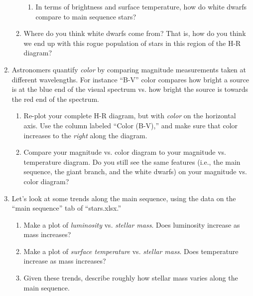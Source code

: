 \documentclass[11pt]{article}
\begin{document}
\begin{enumerate}
\begin{enumerate}
\begin{enumerate}
            \item In terms of brightness and surface temperature, how do white dwarfs compare to main sequence stars?
        \end{enumerate}
        
        \item Where do you think white dwarfs come from? That is, how do you think we end up with this rogue population of stars in this region of the H-R diagram?
    \end{enumerate}
    
    \item Astronomers quantify \emph{color} by comparing magnitude measurements taken at different wavelengths. For instance ``B-V'' color compares how bright a source is at the blue end of the visual spectrum vs. how bright the source is towards the red end of the spectrum.
    \begin{enumerate}
        \item Re-plot your complete H-R diagram, but with \emph{color} on the horizontal axis. Use the column labeled ``Color (B-V),'' and make sure that color increases to the \emph{right} along the diagram.
        
        \item Compare your magnitude vs. color diagram to your magnitude vs. temperature diagram. Do you still see the same features (i.e., the main sequence, the giant branch, and the white dwarfs) on your magnitude vs. color diagram?
    \end{enumerate}
    
    \item Let's look at some trends along the main sequence, using the data on the ``main sequence'' tab of ``stars.xlsx.''
    \begin{enumerate}
        \item Make a plot of \emph{luminosity} vs. \emph{stellar mass}. Does luminosity increase as mass increases?
        
        \item Make a plot of \emph{surface temperature} vs. \emph{stellar mass}. Does temperature increase as mass increases?
        
        \item Given these trends, describe roughly how stellar mass varies along the main sequence.
    \end{enumerate}
    
    
    
\end{enumerate} 
\end{document}
